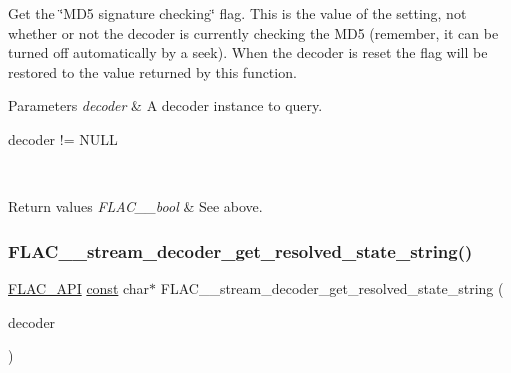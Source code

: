 Get the \char`\"{}\+M\+D5 signature checking\char`\"{} flag. This is the value of the setting, not whether or not the decoder is currently checking the M\+D5 (remember, it can be turned off automatically by a seek). When the decoder is reset the flag will be restored to the value returned by this function.


\begin{DoxyParams}{Parameters}
{\em decoder} & A decoder instance to query.  
\begin{DoxyCode}
decoder != NULL 
\end{DoxyCode}
 \\
\hline
\end{DoxyParams}

\begin{DoxyRetVals}{Return values}
{\em F\+L\+A\+C\+\_\+\+\_\+bool} & See above. \\
\hline
\end{DoxyRetVals}
\mbox{\label{group__flac__stream__decoder_ga0f086d3e2114f378b06e585ab6f4ff6b}} 
\subsubsection{\texorpdfstring{F\+L\+A\+C\+\_\+\+\_\+stream\+\_\+decoder\+\_\+get\+\_\+resolved\+\_\+state\+\_\+string()}{FLAC\_\_stream\_decoder\_get\_resolved\_state\_string()}}
{\footnotesize\ttfamily \hyperlink{group__flac__export_ga56ca07df8a23310707732b1c0007d6f5}{F\+L\+A\+C\+\_\+\+A\+PI} \hyperlink{zconf_8h_a2c212835823e3c54a8ab6d95c652660e}{const} char$\ast$ F\+L\+A\+C\+\_\+\+\_\+stream\+\_\+decoder\+\_\+get\+\_\+resolved\+\_\+state\+\_\+string (\begin{DoxyParamCaption}\item[{\hyperlink{zconf_8h_a2c212835823e3c54a8ab6d95c652660e}{const} \hyperlink{struct_f_l_a_c_____stream_decoder}{F\+L\+A\+C\+\_\+\+\_\+\+Stream\+Decoder} $\ast$}]{decoder }\end{DoxyParamCaption})}

